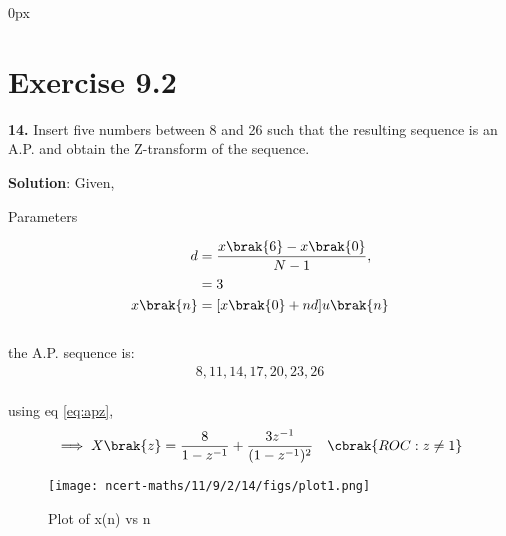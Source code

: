 \documentclass[journal,12pt,twocolumn]{IEEEtran}
\begin{document}
\parindent 0px


\vspace{3cm}

\title{}
\author{EE23BTECH11208 - Manohar K$^{*}$
}
\maketitle
\newpage
\bigskip


\section*{Exercise 9.2}

\noindent \textbf{14.} \hspace{2pt} Insert five numbers between 8 and 26 such that the resulting sequence is an A.P. and obtain the Z-transform of the sequence.

\noindent \textbf{Solution}:
\noindent
\fi
Given,
\begin{table}[h]
    \centering
    
    \caption{Parameters}
    \label{tab: 11.9.2.14.1}
\end{table}
\begin{align}
	d&=\frac{x\brak{6} - x\brak{0}}{N-1},\\
    &=3\\
	x\brak{n}&=[x\brak{0}+nd] u\brak{n}
\end{align}\\	
the A.P. sequence is:\\
\begin{align}
8,11,14,17,20,23,26
\end{align}\\
using eq \eqref{eq:apz},
\begin{align}
    \implies X\brak{z}&=\frac{8}{1-z^{-1}} + \frac{3 z^{-1}}{(1-z^{-1})^2} &\cbrak{ROC : z \neq 1}
\end{align}
\begin{figure}[ht]
\centering
   \texttt{[image: ncert-maths/11/9/2/14/figs/plot1.png]}
   \caption{Plot of x(n) vs n}
   \hfill\label{fig: 11.9.2.14}
\end{figure}
\end{document}
